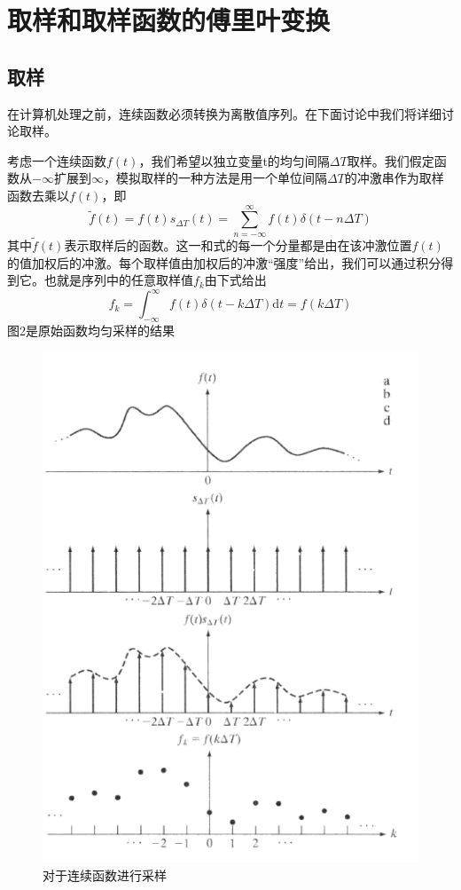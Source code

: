\documentclass[UTF8,a4paper]{ctexart}
\begin{document}
\section{取样和取样函数的傅里叶变换\cite{Gonzalez.2009}}
\subsection{取样}
在计算机处理之前，连续函数必须转换为离散值序列。在下面讨论中我们将详细讨论取样。\par
考虑一个连续函数$f(t)$，我们希望以独立变量t的均匀间隔$\Delta T$取样。我们假定函数从$-\infty$扩展到$\infty$，模拟取样的一种方法是用一个单位间隔$\Delta T$的冲激串作为取样函数去乘以$f(t)$，即
\begin{equation}\tilde{f}(t)=f(t) s_{\Delta T}(t)=\sum_{n=-\infty}^{\infty} f(t) \delta(t-n \Delta T)\end{equation}
其中$\tilde{f}(t)$表示取样后的函数。这一和式的每一个分量都是由在该冲激位置$f(t)$的值加权后的冲激。每个取样值由加权后的冲激“强度”给出，我们可以通过积分得到它。也就是序列中的任意取样值$f_{k}$由下式给出
\begin{equation}
	f_{k}=\int_{-\infty}^{\infty}f(t)\delta(t-k\Delta T)\mathrm{d}t=f(k\Delta T)
\end{equation}
图2是原始函数均匀采样的结果
\begin{figure}[ht]
	\centering
	\includegraphics[scale=0.6]{pic2.png}
	\caption{对于连续函数进行采样}
\end{figure}
\end{document}
